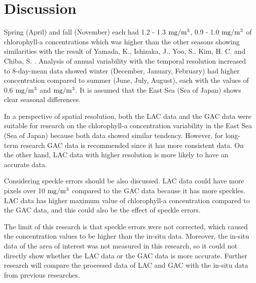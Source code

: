 \section{Discussion}
Spring (April) and fall (November) each had 1.2 - 1.3 $\rm mg/m^3$, 0.9 - 1.0 $\rm mg/m^3$ of chlorophyll-a concentrations which was higher than the other seasons showing similarities with the result of Yamada, K., Ishizaka, J., Yoo, S., Kim, H. C. and Chiba, S. \cite{yamada2004seasonal}. Analysis of annual variability with the temporal resolution increased to 8-day-mean data showed winter (December, January, February) had higher concentration compared to summer (June, July, August), each with the values of 0.6 $\rm mg/m^3$ and $\rm mg/m^3$. It is assumed that the East Sea (Sea of Japan) shows clear seasonal differences.

In a perspective of spatial resolution, both the LAC data and the GAC data were suitable for research on the chlorophyll-a concentration variability in the East Sea (Sea of Japan) because both data showed similar tendency. However, for long-term research GAC data is recommended since it has more consistent data. On the other hand, LAC data with higher resolution is more likely to have an accurate data. 

Considering speckle errors should be also discussed. LAC data could have more pixels over 10 $\rm mg/m^3$ compared to the GAC data because it has more speckles. LAC data has higher maximum value of chlorophyll-a concentration compared to the GAC data, and this could also be the effect of speckle errors. 

The limit of this research is that speckle errors were not corrected, which caused the concentration values to be higher than the in-situ data. Moreover, the in-situ data of the area of interest was not measured in this research, so it could not directly show whether the LAC data or the GAC data is more accurate. Further research will compare the processed data of LAC and GAC with the in-situ data from previous researches.
